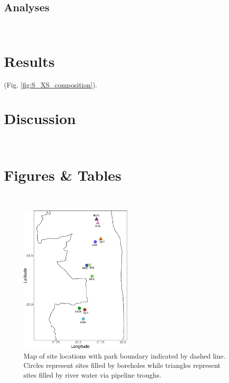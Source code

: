 \subsection*{Analyses}
\lipsum[66]\\
\section{Results}
\lipsum[66](Fig. \ref{fig:S_XS_composition}).
\\
\section{Discussion}
\lipsum[66]
\\

\newpage
\section*{Figures \& Tables}
\\

\begin{figure}[!ht]
  \centering
    \includegraphics[width=0.5\textwidth]{plots_tables/chap_1/kruger_points_simple.pdf}
  \caption{Map of site locations with park boundary indicated by dashed line. Circles represent sites filled by boreholes while triangles represent sites filled by river water via pipeline troughs.}
  \label{fig:map}
\end{figure}


